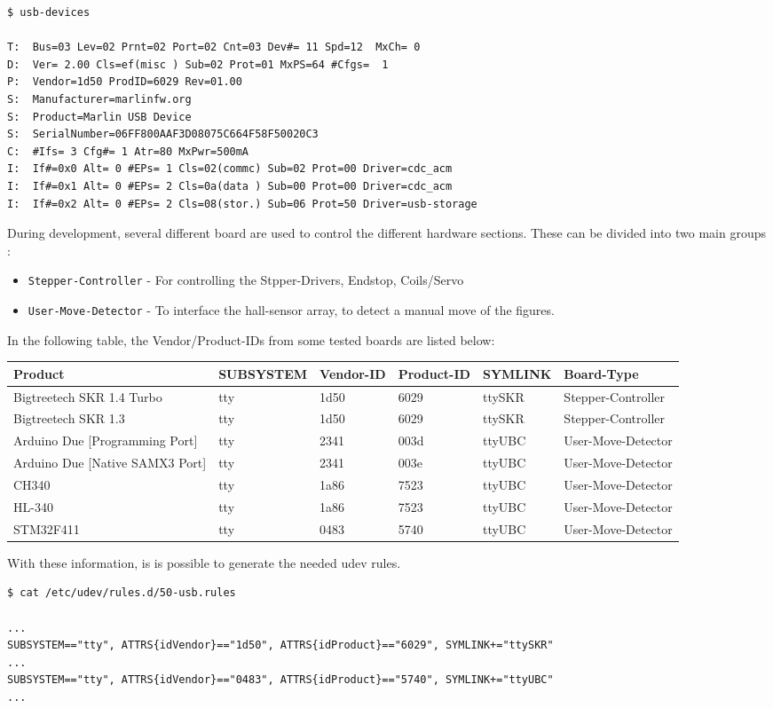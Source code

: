 \documentclass[
  english,
  paper=a4,
  ,captions=tableheading
]{scrartcl}
\newcommand{\passthrough}[1]{#1}
\providecommand{\tightlist}{%
  \setlength{\itemsep}{0pt}\setlength{\parskip}{0pt}}
\begin{document}
\begin{lstlisting}
$ usb-devices

T:  Bus=03 Lev=02 Prnt=02 Port=02 Cnt=03 Dev#= 11 Spd=12  MxCh= 0
D:  Ver= 2.00 Cls=ef(misc ) Sub=02 Prot=01 MxPS=64 #Cfgs=  1
P:  Vendor=1d50 ProdID=6029 Rev=01.00
S:  Manufacturer=marlinfw.org 
S:  Product=Marlin USB Device
S:  SerialNumber=06FF800AAF3D08075C664F58F50020C3
C:  #Ifs= 3 Cfg#= 1 Atr=80 MxPwr=500mA
I:  If#=0x0 Alt= 0 #EPs= 1 Cls=02(commc) Sub=02 Prot=00 Driver=cdc_acm
I:  If#=0x1 Alt= 0 #EPs= 2 Cls=0a(data ) Sub=00 Prot=00 Driver=cdc_acm
I:  If#=0x2 Alt= 0 #EPs= 2 Cls=08(stor.) Sub=06 Prot=50 Driver=usb-storage
\end{lstlisting}

During development, several different board are used to control the
different hardware sections. These can be divided into two main groups :

\begin{itemize}
\tightlist
\item
  \passthrough{\lstinline!Stepper-Controller!} - For controlling the
  Stpper-Drivers, Endstop, Coils/Servo
\item
  \passthrough{\lstinline!User-Move-Detector!} - To interface the
  hall-sensor array, to detect a manual move of the figures.
\end{itemize}

In the following table, the Vendor/Product-IDs from some tested boards
are listed below:

\begin{longtable}[]{@{}llllll@{}}
\toprule
Product & SUBSYSTEM & Vendor-ID & Product-ID & SYMLINK &
Board-Type\tabularnewline
\midrule
\endhead
Bigtreetech SKR 1.4 Turbo & tty & 1d50 & 6029 & ttySKR &
Stepper-Controller\tabularnewline
Bigtreetech SKR 1.3 & tty & 1d50 & 6029 & ttySKR &
Stepper-Controller\tabularnewline
Arduino Due {[}Programming Port{]} & tty & 2341 & 003d & ttyUBC &
User-Move-Detector\tabularnewline
Arduino Due {[}Native SAMX3 Port{]} & tty & 2341 & 003e & ttyUBC &
User-Move-Detector\tabularnewline
CH340 & tty & 1a86 & 7523 & ttyUBC & User-Move-Detector\tabularnewline
HL-340 & tty & 1a86 & 7523 & ttyUBC & User-Move-Detector\tabularnewline
STM32F411 & tty & 0483 & 5740 & ttyUBC &
User-Move-Detector\tabularnewline
\bottomrule
\end{longtable}

With these information, is is possible to generate the needed udev
rules.

\begin{lstlisting}
$ cat /etc/udev/rules.d/50-usb.rules

...
SUBSYSTEM=="tty", ATTRS{idVendor}=="1d50", ATTRS{idProduct}=="6029", SYMLINK+="ttySKR"
...
SUBSYSTEM=="tty", ATTRS{idVendor}=="0483", ATTRS{idProduct}=="5740", SYMLINK+="ttyUBC"
...
\end{lstlisting}
\end{document}

